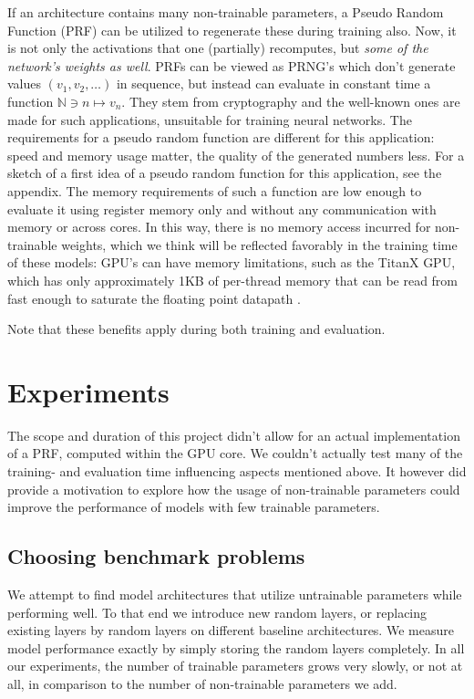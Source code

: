 \documentclass[]{article}
\begin{document}
\begin{multicols}{2}
	If an architecture contains many non-trainable parameters, a Pseudo Random Function (PRF) \cite{Goldreich_Goldwasser_Micali_1986} can be utilized to regenerate these during training also. Now, it is not only the activations that one (partially) recomputes, but \emph{some of the network's weights as well}. PRFs can be viewed as PRNG's which don't generate values $(v_1, v_2, \ldots)$ in sequence, but instead can evaluate in constant time a function $\mathds{N} \ni n \mapsto v_n$. They stem from cryptography and the well-known ones are made for such applications, unsuitable for training neural networks. The requirements for a pseudo random function are different for this application: speed and memory usage matter, the quality of the generated numbers less. For a sketch of a first idea of a pseudo random function for this application, see the appendix. The memory requirements of such a function are low enough to evaluate it using register memory only and without any communication with memory or across cores. In this way, there is no memory access incurred for non-trainable weights, which we think will be reflected favorably in the training time of these models: GPU's can have memory limitations, such as the TitanX GPU, which has only approximately 1KB of per-thread memory that can be read from fast enough to saturate the floating point datapath \cite{DBLP:conf/icml/DiamosSCCCEEHS16}. 
	
	Note that these benefits apply during both training and evaluation.
	
	\section{Experiments}\label{experiments}
	The scope and duration of this project didn't allow for an actual implementation of a PRF, computed within the GPU core. We couldn't actually test many of the training- and evaluation time influencing aspects mentioned above. It however did provide a motivation to explore how the usage of non-trainable parameters could improve the performance of models with few trainable parameters.
	
	\subsection{Choosing benchmark problems}
	We attempt to find model architectures that utilize untrainable parameters while performing well. To that end we introduce new random layers, or replacing existing layers by random layers on different baseline architectures. We measure model performance exactly by simply storing the random layers completely. In all our experiments, the number of trainable parameters grows very slowly, or not at all, in comparison to the number of non-trainable parameters we add.
	

\end{multicols}
\end{document}
